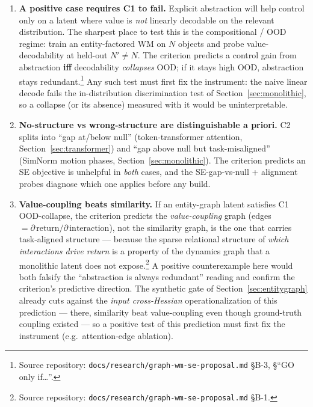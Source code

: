 \documentclass{article}
\begin{document}
\begin{enumerate}
\item \textbf{A positive case requires C1 to fail.} Explicit abstraction will help control only on a latent where value is \emph{not} linearly decodable on the relevant distribution. The sharpest place to test this is the compositional / OOD regime: train an entity-factored WM on $N$ objects and probe value-decodability at held-out $N' \neq N$. The criterion predicts a control gain from abstraction \textbf{iff} decodability \emph{collapses} OOD; if it stays high OOD, abstraction stays redundant.\footnote{Source repository: \texttt{docs/research/graph-wm-se-proposal.md} \S B-3, \S``GO only if\ldots''.} Any such test must first fix the instrument: the naive linear decode fails the in-distribution discrimination test of Section~\ref{sec:monolithic}, so a collapse (or its absence) measured with it would be uninterpretable.

\item \textbf{No-structure vs wrong-structure are distinguishable a priori.} C2 splits into ``gap at/below null'' (token-transformer attention, Section~\ref{sec:transformer}) and ``gap above null but task-misaligned'' (SimNorm motion phases, Section~\ref{sec:monolithic}). The criterion predicts an SE objective is unhelpful in \emph{both} cases, and the SE-gap-vs-null + alignment probes diagnose which one applies before any build.

\item \textbf{Value-coupling beats similarity.} If an entity-graph latent satisfies C1 OOD-collapse, the criterion predicts the \emph{value-coupling} graph (edges $= \partial\,\text{return}/\partial\,\text{interaction}$), not the similarity graph, is the one that carries task-aligned structure --- because the sparse relational structure of \emph{which interactions drive return} is a property of the dynamics graph that a monolithic latent does not expose.\footnote{Source repository: \texttt{docs/research/graph-wm-se-proposal.md} \S B-1.} A positive counterexample here would both falsify the ``abstraction is always redundant'' reading and confirm the criterion's predictive direction. The synthetic gate of Section~\ref{sec:entitygraph} already cuts against the \emph{input cross-Hessian} operationalization of this prediction --- there, similarity beat value-coupling even though ground-truth coupling existed --- so a positive test of this prediction must first fix the instrument (e.g.\ attention-edge ablation).
\end{enumerate}
\end{document}
